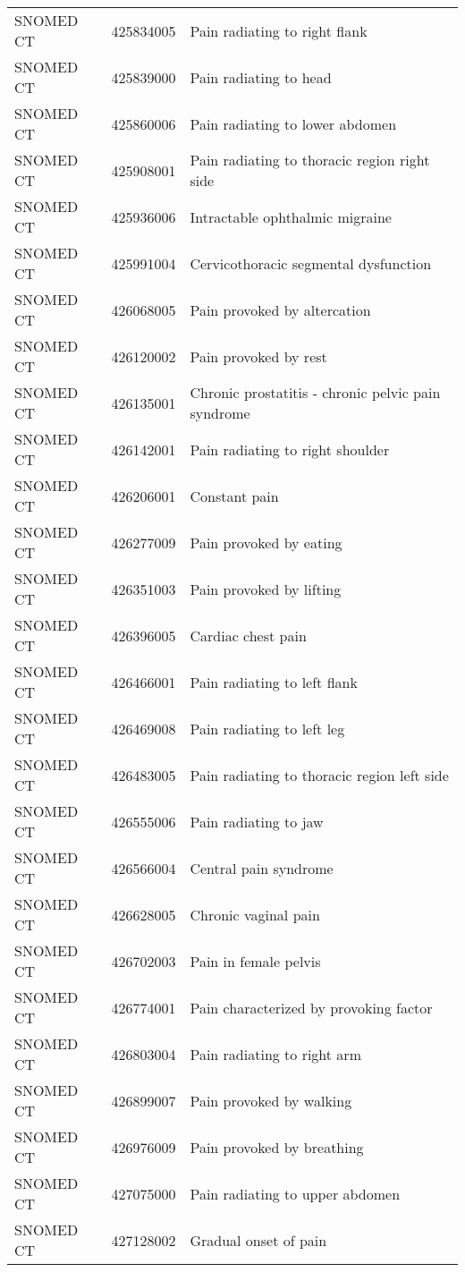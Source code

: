 \begin{longtable}{p{}p{}p{}}
  SNOMED CT & 425834005 & Pain radiating to right flank \\ 
  SNOMED CT & 425839000 & Pain radiating to head \\ 
  SNOMED CT & 425860006 & Pain radiating to lower abdomen \\ 
  SNOMED CT & 425908001 & Pain radiating to thoracic region right side \\ 
  SNOMED CT & 425936006 & Intractable ophthalmic migraine \\ 
  SNOMED CT & 425991004 & Cervicothoracic segmental dysfunction \\ 
  SNOMED CT & 426068005 & Pain provoked by altercation \\ 
  SNOMED CT & 426120002 & Pain provoked by rest \\ 
  SNOMED CT & 426135001 & Chronic prostatitis - chronic pelvic pain syndrome \\ 
  SNOMED CT & 426142001 & Pain radiating to right shoulder \\ 
  SNOMED CT & 426206001 & Constant pain \\ 
  SNOMED CT & 426277009 & Pain provoked by eating \\ 
  SNOMED CT & 426351003 & Pain provoked by lifting \\ 
  SNOMED CT & 426396005 & Cardiac chest pain \\ 
  SNOMED CT & 426466001 & Pain radiating to left flank \\ 
  SNOMED CT & 426469008 & Pain radiating to left leg \\ 
  SNOMED CT & 426483005 & Pain radiating to thoracic region left side \\ 
  SNOMED CT & 426555006 & Pain radiating to jaw \\ 
  SNOMED CT & 426566004 & Central pain syndrome \\ 
  SNOMED CT & 426628005 & Chronic vaginal pain \\ 
  SNOMED CT & 426702003 & Pain in female pelvis \\ 
  SNOMED CT & 426774001 & Pain characterized by provoking factor \\ 
  SNOMED CT & 426803004 & Pain radiating to right arm \\ 
  SNOMED CT & 426899007 & Pain provoked by walking \\ 
  SNOMED CT & 426976009 & Pain provoked by breathing \\ 
  SNOMED CT & 427075000 & Pain radiating to upper abdomen \\ 
  SNOMED CT & 427128002 & Gradual onset of pain \\ 

\end{longtable}
